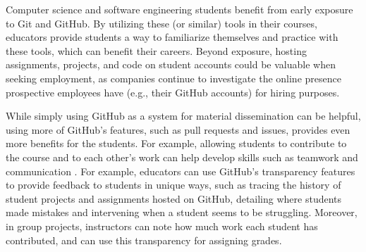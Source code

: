 Computer science and software engineering students benefit from early exposure to Git and GitHub. By utilizing these (or similar) tools in their courses, educators provide students a way to familiarize themselves and practice with these tools, which can benefit their careers. Beyond exposure, hosting assignments, projects, and code on student accounts could be valuable when seeking employment, as companies continue to investigate the online presence prospective employees have (e.g., their GitHub accounts) for hiring purposes.

While simply using GitHub as a system for material dissemination can be helpful, using more of GitHub's features, such as pull requests and issues, provides even more benefits for the students. For example, allowing students to contribute to the course and to each other's work can help develop skills such as teamwork and communication \cite{hamer2006some}. For example, educators can use GitHub's transparency features to provide feedback to students in unique ways, such as tracing the history of student projects and assignments hosted on GitHub, detailing where students made mistakes and intervening when a student seems to be struggling. Moreover, in group projects, instructors can note how much work each student has contributed, and can use this transparency for assigning grades.

\\


